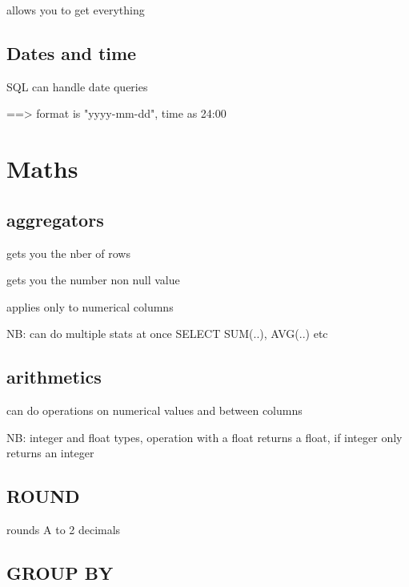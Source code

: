 		\code{*} allows you to get everything

	\subsection{Dates and time}

		SQL can handle date queries

		 ==> format is "yyyy-mm-dd", time as 24:00




\section{Maths}

	\subsection{aggregators}

		 gets you the nber of rows

		 gets you the number non null value

		 applies only to numerical columns



		NB: can do multiple stats at once SELECT SUM(..), AVG(..) etc

	\subsection{arithmetics}

		can do operations on numerical values and between columns



		NB: integer and float types, operation with a float returns a float, if integer only returns an integer

	\subsection{ROUND}

		 rounds A to 2 decimals

	\subsection{GROUP BY}

